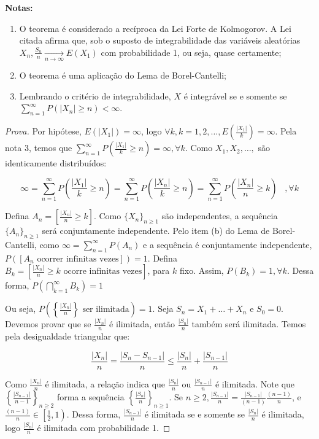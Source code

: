 \documentclass[
]{article}
\theoremstyle{definition}
\theoremstyle{definition}
\theoremstyle{definition}
\theoremstyle{definition}
\theoremstyle{remark}
\begin{document}
\textbf{Notas:}

\begin{enumerate}
\def\labelenumi{\arabic{enumi})}
\item
  O teorema é considerado a recíproca da Lei Forte de Kolmogorov. A Lei citada afirma que, sob o suposto de integrabilidade das variáveis aleatórias \(X_{n}, \frac{S_{n}}{n} \xrightarrow[n \to \infty]{}E(X_{1})\) com probabilidade 1, ou seja, quase certamente;
\item
  O teorema é uma aplicação do Lema de Borel-Cantelli;
\item
  Lembrando o critério de integrabilidade, \(X\) é integrável se e somente se \(\sum_{n=1}^{\infty}P(|X_{n}| \ge n) < \infty\).
\end{enumerate}

\begin{proof}[Prova]
Por hipótese, \(E(|X_{1}|) = \infty\), logo \(\forall k, k = 1,2,\ldots, E\left(\frac{|X_{1}|}{k}\right) = \infty\). Pela nota 3, temos que \(\sum_{n=1}^{\infty}P\left(\frac{|X_{1}|}{k} \ge n\right) = \infty, \forall k\). Como \(X_{1},X_{2},\ldots,\) são identicamente distribuídos:

\begin{equation*}
\infty = \sum_{n=1}^{\infty}P\left(\frac{|X_{1}|}{k} \ge n\right) = \sum_{n=1}^{\infty}P\left(\frac{|X_{n}|}{k} \ge n\right) = \sum_{n=1}^{\infty}P\left(\frac{|X_{n}|}{n} \ge k\right) \;\;\; ,\forall k
\end{equation*}

Defina \(A_{n} = \left[\frac{|X_{n}|}{n} \ge k\right]\). Como \(\{X_{n}\}_{n \ge 1}\) são independentes, a sequência \(\{A_{n}\}_{n \ge 1}\) será conjuntamente independente. Pelo item (b) do Lema de Borel-Cantelli, como \(\infty = \sum_{n=1}^{\infty}P(A_{n})\) e a sequência é conjuntamente independente, \(P([A_{n} \text{ ocorrer infinitas vezes}]) = 1\). Defina \(B_{k} = \left[\frac{|X_{n}|}{n} \ge k \text{ ocorre infinitas vezes}\right]\), para \(k\) fixo. Assim, \(P(B_{k}) = 1, \forall k\). Dessa forma, \(P\left(\bigcap_{k=1}^{\infty}B_{k}\right) = 1\)

Ou seja, \(P\left(\left\{\frac{|X_{n}|}{n}\right\} \text{ ser ilimitada}\right) = 1\). Seja \(S_{n} = X_{1} + \ldots + X_{n}\) e \(S_{0} = 0\). Devemos provar que se \(\frac{|X_{n}|}{n}\) é ilimitada, então \(\frac{|S_{n}|}{n}\) também será ilimitada. Temos pela desigualdade triangular que:

\begin{equation*}
\frac{|X_{n}|}{n} = \frac{|S_{n} - S_{n-1}|}{n} \le \frac{|S_{n}|}{n} + \frac{|S_{n-1}|}{n}
\end{equation*}

Como \(\frac{|X_{n}|}{n}\) é ilimitada, a relação indica que \(\frac{|S_{n}|}{n} \text{ ou } \frac{|S_{n-1}|}{n}\) é ilimitada. Note que \(\left\{\frac{|S_{n-1}|}{n-1}\right\}_{n \ge 2}\) forma a sequência \(\left\{\frac{|S_{n}|}{n}\right\}_{n \ge 1}\). Se \(n \ge 2, \frac{|S_{n-1}|}{n} = \frac{|S_{n-1}|}{(n-1)}\frac{(n-1)}{n}\), e \(\frac{(n-1)}{n} \in \left[\frac{1}{2},1\right)\). Dessa forma, \(\frac{|S_{n-1}|}{n}\) é ilimitada se e somente se \(\frac{|S_{n}|}{n}\) é ilimitada, logo \(\frac{|S_{n}|}{n}\) é ilimitada com probabilidade 1.
\end{proof}
\end{document}
